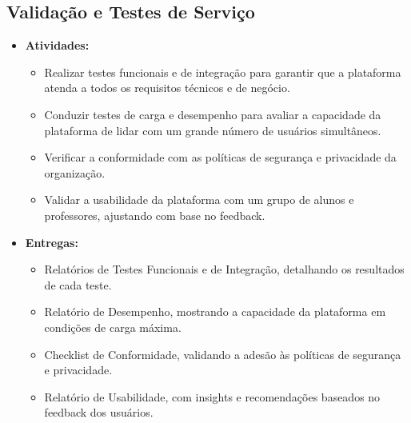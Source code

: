 \documentclass{article}
\begin{document}
\subsection{Validação e Testes de Serviço}
\begin{itemize}
    \item \textbf{Atividades:}
    \begin{itemize}
        \item Realizar testes funcionais e de integração para garantir que a plataforma atenda a todos os requisitos técnicos e de negócio.
        \item Conduzir testes de carga e desempenho para avaliar a capacidade da plataforma de lidar com um grande número de usuários simultâneos.
        \item Verificar a conformidade com as políticas de segurança e privacidade da organização.
        \item Validar a usabilidade da plataforma com um grupo de alunos e professores, ajustando com base no feedback.
    \end{itemize}
    \item \textbf{Entregas:}
    \begin{itemize}
        \item Relatórios de Testes Funcionais e de Integração, detalhando os resultados de cada teste.
        \item Relatório de Desempenho, mostrando a capacidade da plataforma em condições de carga máxima.
        \item Checklist de Conformidade, validando a adesão às políticas de segurança e privacidade.
        \item Relatório de Usabilidade, com insights e recomendações baseados no feedback dos usuários.
    \end{itemize}
\end{itemize}
\end{document}
